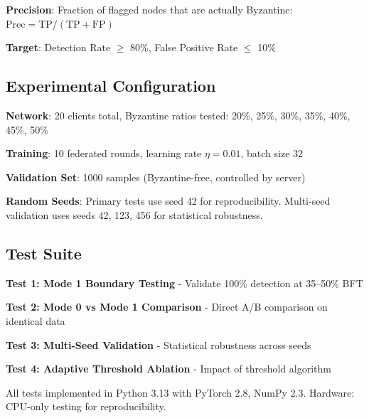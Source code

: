 \textbf{Precision}: Fraction of flagged nodes that are actually Byzantine: $\text{Prec} = \text{TP} / (\text{TP} + \text{FP})$

\textbf{Target}: Detection Rate $\geq$ 80\%, False Positive Rate $\leq$ 10\%

\subsection{Experimental Configuration}

\textbf{Network}: 20 clients total, Byzantine ratios tested: 20\%, 25\%, 30\%, 35\%, 40\%, 45\%, 50\%

\textbf{Training}: 10 federated rounds, learning rate $\eta = 0.01$, batch size 32

\textbf{Validation Set}: 1000 samples (Byzantine-free, controlled by server)

\textbf{Random Seeds}: Primary tests use seed 42 for reproducibility. Multi-seed validation uses seeds 42, 123, 456 for statistical robustness.

\subsection{Test Suite}

\textbf{Test 1: Mode 1 Boundary Testing} - Validate 100\% detection at 35--50\% BFT

\textbf{Test 2: Mode 0 vs Mode 1 Comparison} - Direct A/B comparison on identical data

\textbf{Test 3: Multi-Seed Validation} - Statistical robustness across seeds

\textbf{Test 4: Adaptive Threshold Ablation} - Impact of threshold algorithm

All tests implemented in Python 3.13 with PyTorch 2.8, NumPy 2.3. Hardware: CPU-only testing for reproducibility.
